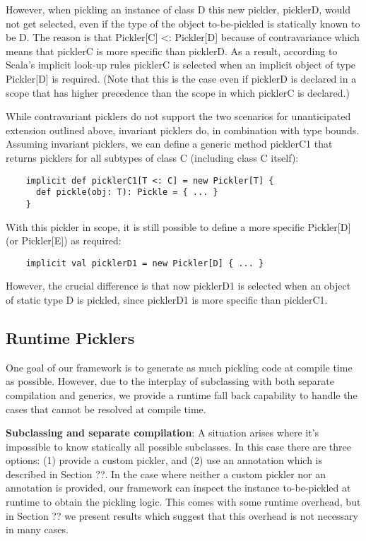 \documentclass[preprint,10pt]{sigplanconf}
\begin{document}
However, when pickling an instance of class D this new pickler, picklerD, would not get selected, even if the type of the object to-be-pickled is statically known to be D. The reason is that Pickler[C] <: Pickler[D] because of contravariance which means that picklerC is more specific than picklerD. As a result, according to Scala's implicit look-up rules picklerC is selected when an implicit object of type Pickler[D] is required. (Note that this is the case even if picklerD is declared in a scope that has higher precedence than the scope in which picklerC is declared.)

While contravariant picklers do not support the two scenarios for unanticipated extension outlined above, invariant picklers do, in combination with type bounds. Assuming invariant picklers, we can define a generic method picklerC1 that returns picklers for all subtypes of class C (including class C itself):

\begin{verbatim}
    implicit def picklerC1[T <: C] = new Pickler[T] {
      def pickle(obj: T): Pickle = { ... }
    }
\end{verbatim}

With this pickler in scope, it is still possible to define a more specific Pickler[D] (or Pickler[E]) as required:

\begin{verbatim}
    implicit val picklerD1 = new Pickler[D] { ... }
\end{verbatim}

However, the crucial difference is that now picklerD1 is selected when an object of static type D is pickled, since picklerD1 is more specific than picklerC1.

\subsection{Runtime Picklers}

One goal of our framework is to generate as much pickling code at compile time as possible. However, due to the interplay of subclassing with both separate compilation and generics, we provide a runtime fall back capability to handle the cases that cannot be resolved at compile time.

{\bf Subclassing and separate compilation}: A situation arises where it's impossible to know statically all possible subclasses. In this case there are three options: (1) provide a custom pickler, and (2) use an annotation which is described in Section ??. In the case where neither a custom pickler nor an annotation is provided, our framework can inspect the instance to-be-pickled at runtime to obtain the pickling logic. This comes with some runtime overhead, but in Section ?? we present results which suggest that this overhead is not necessary in many cases.
\end{document}
